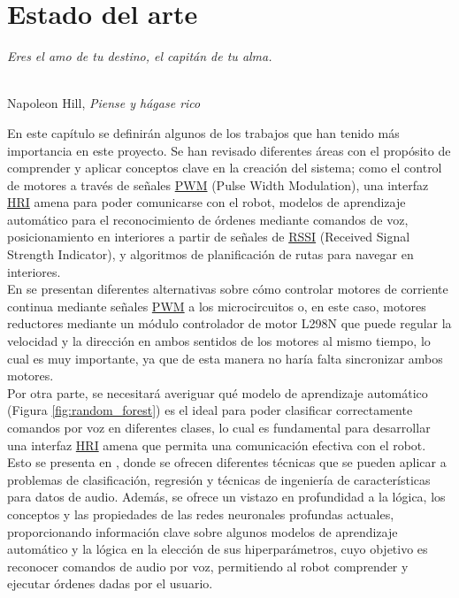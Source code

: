 \chapter{Estado del arte}
\label{cap:capitulo2}
\setcounter{page}{1}

\begin{flushright}
\begin{minipage}[]{10cm}
\emph{Eres el amo de tu destino, el capitán de tu alma.}\\
\end{minipage}\\

Napoleon Hill, \textit{Piense y hágase rico}\\
\end{flushright}

\vspace{1cm}



En este capítulo se definirán algunos de los trabajos que han tenido más importancia en este proyecto. Se han revisado diferentes áreas con el propósito de comprender y aplicar conceptos clave en la creación del sistema; como el control de motores a través de señales \hyperlink{PWM}{PWM} (Pulse Width Modulation), una interfaz \hyperlink{HRI}{HRI} amena para poder comunicarse con el robot, modelos de aprendizaje automático para el reconocimiento de órdenes mediante comandos de voz, posicionamiento en interiores a partir de señales de \hyperlink{RSSI}{RSSI} (Received Signal Strength Indicator), y algoritmos de planificación de rutas para navegar en interiores.\\


En \cite{9815716} se presentan diferentes alternativas sobre cómo controlar motores de corriente continua mediante señales \hyperlink{PWM}{PWM} a los microcircuitos o, en este caso, motores reductores mediante un módulo controlador de motor L298N que puede regular la velocidad y la dirección en ambos sentidos de los motores al mismo tiempo, lo cual es muy importante, ya que de esta manera no haría falta sincronizar ambos motores.\\

Por otra parte, se necesitará averiguar qué modelo de aprendizaje automático (Figura \ref{fig:random_forest}) es el ideal para poder clasificar correctamente comandos por voz en diferentes clases, lo cual es fundamental para desarrollar una interfaz \hyperlink{HRI}{HRI} amena que permita una comunicación efectiva con el robot. Esto se presenta en \cite{Zenkov-sklearn-SER-basics}, donde se ofrecen diferentes técnicas que se pueden aplicar a problemas de clasificación, regresión y técnicas de ingeniería de características para datos de audio. Además, se ofrece un vistazo en profundidad a la lógica, los conceptos y las propiedades de las redes neuronales profundas actuales, proporcionando información clave sobre algunos modelos de aprendizaje automático y la lógica en la elección de sus hiperparámetros, cuyo objetivo es reconocer comandos de audio por voz, permitiendo al robot comprender y ejecutar órdenes dadas por el usuario.\\

